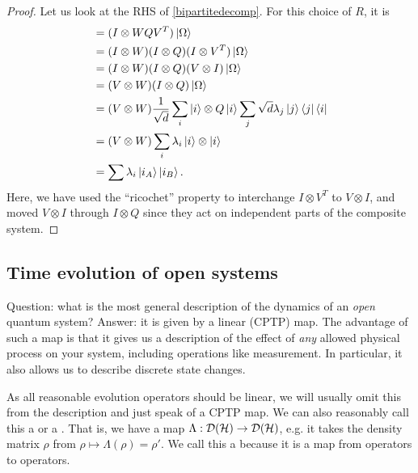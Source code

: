 \begin{itemize}
\begin{proof}
        Let us look at the RHS of \ref{bipartitedecomp}. For this choice of $R$, it is
        \begin{align*}
            &=(I\otimes WQV^T) \left| \Omega \right>\\
            &=(I\otimes W)(I\otimes Q)(I\otimes V^T)\left| \Omega \right>\\
            &=(I\otimes W)(I\otimes Q)(V\otimes I)\left| \Omega \right>\\
            &= (V\otimes W)(I\otimes Q) \left| \Omega \right>\\
            &= (V\otimes W) \frac{1}{\sqrt{d}} \sum_i \left|  i \right>\otimes Q\left| i \right> \sum_j \sqrt{d} \lambda_j \left| j \right>\left< j \right|\left< i \right|\\
            &=(V\otimes W) \sum_i \lambda_i \left| i \right>\otimes \left| i \right>\\
            &= \sum \lambda_i \left| i_A \right> \left| i_B \right>.\qedhere
        \end{align*}
        Here, we have used the ``ricochet'' property to interchange $I\otimes V^T$ to $V\otimes I$, and moved $V\otimes I$ through $I\otimes Q$ since they act on independent parts of the composite system.
    \end{proof}
\end{itemize}

\subsection*{Time evolution of open systems}
Question: what is the most general description of the dynamics of an \emph{open} quantum system? Answer: it is given by a linear  (CPTP) map. The advantage of such a map is that it gives us a description of the effect of \emph{any} allowed physical process on your system, including operations like measurement. In particular, it also allows us to describe discrete state changes.

As all reasonable evolution operators should be linear, we will usually omit this from the description and just speak of a CPTP map. We can also reasonably call this a  or a . That is, we have a map $\Lambda:\mathcal{D}(\mathcal H)\to \mathcal{D}(\mathcal H)$, e.g. it takes the density matrix $\rho$ from $\rho\mapsto \Lambda(\rho)=\rho'$. We call this a  because it is a map from operators to operators.

